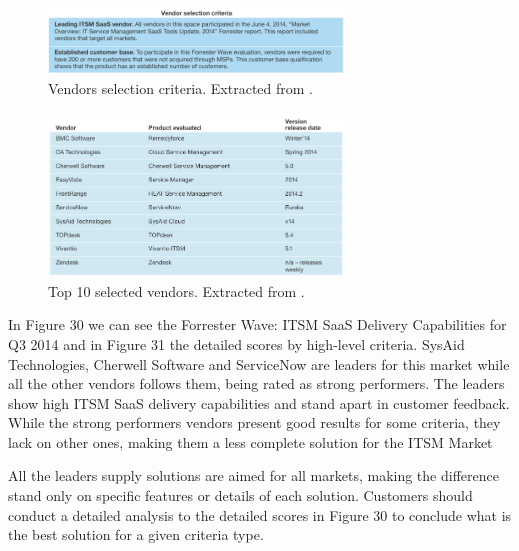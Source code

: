 \begin{figure}[h!]
\centering
\includegraphics[width=0.7\textwidth]{img/VendorSelectionCriteriaITSM.png}
\caption{Vendors selection criteria. Extracted from \cite{forresterWaveITSM}.}
\end{figure}


\begin{figure}[h!]
\centering
\includegraphics[width=0.7\textwidth]{img/ITSMVendorsInfo.png}
\caption{Top 10 selected vendors. Extracted from \cite{forresterWaveITSM}.}
\end{figure}

In Figure 30 we can see the Forrester Wave: ITSM SaaS Delivery Capabilities for Q3 2014 and in Figure 31 the detailed scores by high-level criteria. SysAid Technologies, Cherwell Software and ServiceNow are leaders for this market while all the other vendors follows them, being rated as strong performers. The leaders show high ITSM SaaS delivery capabilities and stand apart in customer feedback. While the strong performers vendors present good results for some criteria, they lack on other ones, making them a less complete solution for the ITSM Market\par
All the leaders supply solutions are aimed for all markets, making the difference stand only on specific features or details of each solution. Customers should conduct a detailed analysis to the detailed scores in Figure 30 to conclude what is the best solution for a given criteria type.\par


